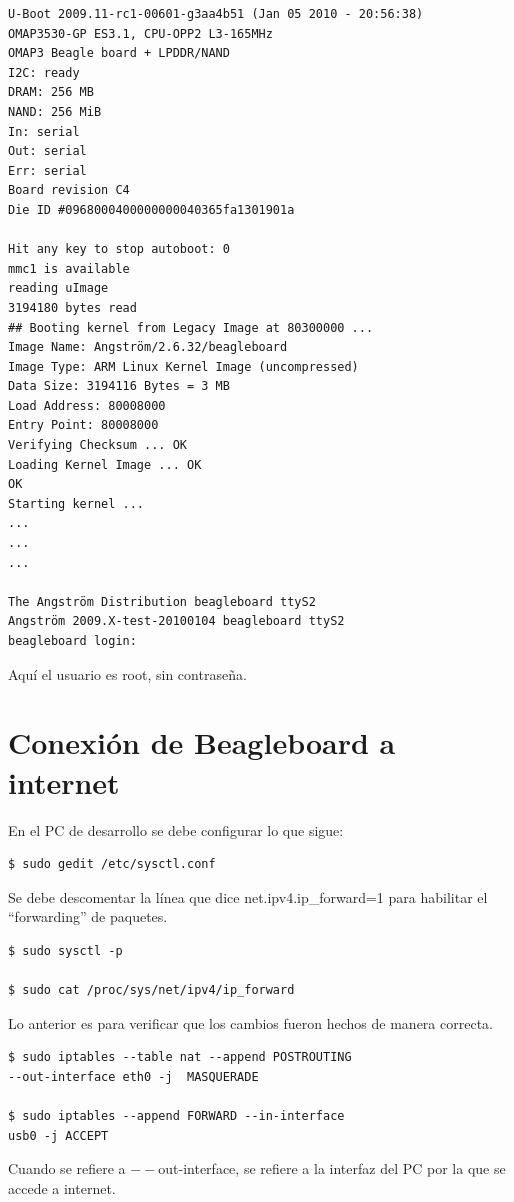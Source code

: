 \begin{verbatim}
U-Boot 2009.11-rc1-00601-g3aa4b51 (Jan 05 2010 - 20:56:38) 
OMAP3530-GP ES3.1, CPU-OPP2 L3-165MHz 
OMAP3 Beagle board + LPDDR/NAND 
I2C: ready 
DRAM: 256 MB 
NAND: 256 MiB 
In: serial 
Out: serial 
Err: serial 
Board revision C4 
Die ID #0968000400000000040365fa1301901a 

Hit any key to stop autoboot: 0 
mmc1 is available 
reading uImage 
3194180 bytes read 
## Booting kernel from Legacy Image at 80300000 ... 
Image Name: Angström/2.6.32/beagleboard 
Image Type: ARM Linux Kernel Image (uncompressed) 
Data Size: 3194116 Bytes = 3 MB 
Load Address: 80008000 
Entry Point: 80008000 
Verifying Checksum ... OK 
Loading Kernel Image ... OK 
OK 
Starting kernel ... 
... 
... 
... 

The Angström Distribution beagleboard ttyS2 
Angström 2009.X-test-20100104 beagleboard ttyS2 
beagleboard login: 
\end{verbatim}

Aquí el usuario es root, sin contraseña.


\newpage
\section{Conexión de Beagleboard a internet}\label{BbInternet}

\bigskip
En el PC de desarrollo se debe configurar lo que sigue:

\begin{verbatim}
$ sudo gedit /etc/sysctl.conf
\end{verbatim}

Se debe descomentar la línea que dice net.ipv4.ip\_forward=1 para habilitar el “forwarding” de paquetes.

\begin{verbatim}
$ sudo sysctl -p

$ sudo cat /proc/sys/net/ipv4/ip_forward
\end{verbatim}

Lo anterior es para verificar que los cambios fueron hechos de manera correcta.

\begin{verbatim}
$ sudo iptables --table nat --append POSTROUTING 
--out-interface eth0 -j  MASQUERADE

$ sudo iptables --append FORWARD --in-interface 
usb0 -j ACCEPT
\end{verbatim}

Cuando se refiere a $--$out-interface, se refiere a la interfaz del PC por la que se accede a internet.



